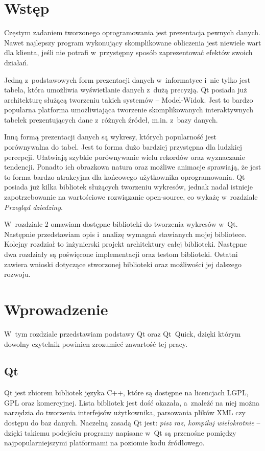 \chapter*{Wstęp}
Częstym zadaniem tworzonego oprogramowania jest prezentacja pewnych danych. Nawet najlepszy program wykonujący skomplikowane obliczenia jest niewiele wart dla klienta, jeśli nie potrafi w~przystępny sposób zaprezentować efektów swoich działań.
 
Jedną z~podstawowych form prezentacji danych w~informatyce i~nie tylko jest tabela, która umożliwia wyświetlanie danych z~dużą precyzją. Qt posiada już architekturę służącą tworzeniu takich systemów -- Model-Widok. Jest to bardzo popularna platforma umożliwiająca tworzenie skomplikowanych interaktywnych tabelek prezentujących dane z~różnych źródeł, m.in. z~bazy danych.

Inną formą prezentacji danych są wykresy, których popularność jest porównywalna do tabel. Jest to forma dużo bardziej przystępna dla ludzkiej percepcji. Ułatwiają szybkie porównywanie wielu rekordów oraz wyznaczanie tendencji. Ponadto ich obrazkowa natura oraz możliwe animacje sprawiają, że jest to forma bardzo atrakcyjna dla końcowego użytkownika oprogramowania.
Qt posiada już kilka bibliotek służących tworzeniu wykresów, jednak nadal istnieje zapotrzebowanie na wartościowe rozwiązanie open-source, co wykażę w~rozdziale \textit{Przegląd dziedziny}.

W~rozdziale 2 omawiam dostępne biblioteki do tworzenia wykresów w~Qt. Następnie przedstawiam opis i~analizę wymagań stawianych mojej bibliotece. Kolejny rozdział to inżynierski projekt architektury całej biblioteki. Następne dwa rozdziały są poświęcone implementacji oraz testom biblioteki. Ostatni  zawiera wnioski dotyczące stworzonej biblioteki oraz możliwości jej dalszego rozwoju. 

\chapter{Wprowadzenie}
W~tym rozdziale przedstawiam podstawy Qt oraz Qt~Quick, dzięki którym dowolny czytelnik powinien zrozumieć zawartość tej pracy.

\section{Qt}
Qt jest zbiorem bibliotek języka C++, które są dostępne na licencjach LGPL, GPL oraz komercyjnej. Lista bibliotek jest dość okazała, a~znaleźć na niej można narzędzia do tworzenia interfejsów użytkownika, parsowania plików XML czy dostępu do baz danych. Naczelną zasadą Qt jest: \textit{pisz raz, kompiluj wielokrotnie} -- dzięki takiemu podejściu programy napisane w~Qt są przenośne pomiędzy najpopularniejszymi platformami na poziomie kodu źródłowego.  


